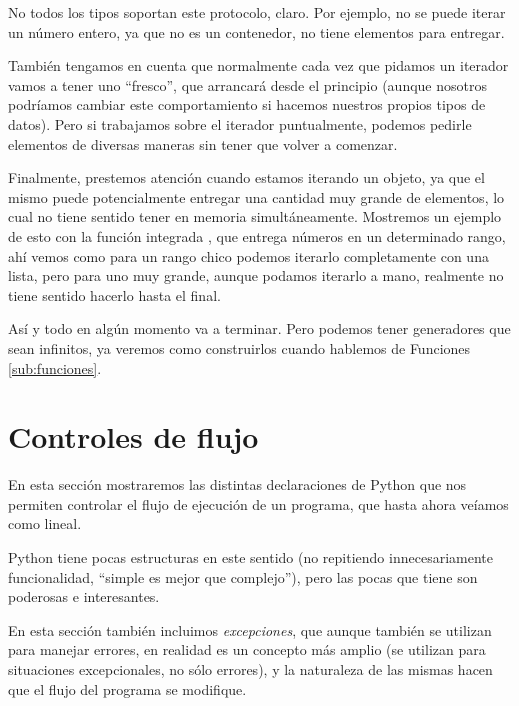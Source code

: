
No todos los tipos soportan este protocolo, claro. Por ejemplo, no se puede iterar un número entero, ya que no es un contenedor, no tiene elementos para entregar.

También tengamos en cuenta que normalmente cada vez que pidamos un iterador vamos a tener uno ``fresco'', que arrancará desde el principio (aunque nosotros podríamos cambiar este comportamiento si hacemos nuestros propios tipos de datos). Pero si trabajamos sobre el iterador puntualmente, podemos pedirle elementos de diversas maneras sin tener que volver a comenzar.


Finalmente, prestemos atención cuando estamos iterando un objeto, ya que el mismo puede potencialmente entregar una cantidad muy grande de elementos, lo cual no tiene sentido tener en memoria simultáneamente. Mostremos un ejemplo de esto con la función integrada , que entrega números en un determinado rango, ahí vemos como para un rango chico podemos iterarlo completamente con una lista, pero para uno muy grande, aunque podamos iterarlo a mano, realmente no tiene sentido hacerlo hasta el final.


Así y todo  en algún momento va a terminar. Pero podemos tener generadores que sean infinitos, ya veremos como construirlos cuando hablemos de Funciones \ref{sub:funciones}.



\section{Controles de flujo}

En esta sección mostraremos las distintas declaraciones de Python que nos permiten controlar el flujo de ejecución de un programa, que hasta ahora veíamos como lineal.

Python tiene pocas estructuras en este sentido (no repitiendo innecesariamente funcionalidad, ``simple es mejor que complejo''), pero las pocas que tiene son poderosas e interesantes.

En esta sección también incluimos \textit{excepciones}, que aunque también se utilizan para manejar errores, en realidad es un concepto más amplio (se utilizan para situaciones excepcionales, no sólo errores), y la naturaleza de las mismas hacen que el flujo del programa se modifique.


